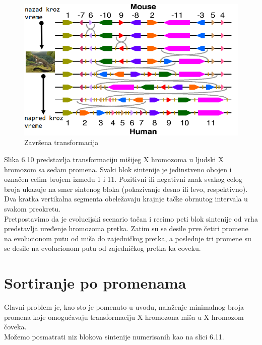 \begin{figure}[h!]
\centering
\includegraphics[scale=0.32]{poglavlja/6/slike/niz7.png}
\caption{Završena transformacija}
\end{figure}

\newpage
Slika 6.10 predstavlja transformaciju mišijeg X hromozoma u ljudski X hromozom sa sedam promena. Svaki blok sintenije je jedinstveno obojen i označen celim brojem između 1 i 11. Pozitivni ili negativni znak svakog celog broja ukazuje na smer sintenog bloka (pokazivanje desno ili levo, respektivno). Dva kratka vertikalna segmenta obeležavaju krajnje tačke obrnutog intervala u svakom preokretu.\\

Pretpostavimo da je evolucijski scenario tačan i recimo peti blok sintenije od vrha predstavlja uređenje hromozoma pretka. Zatim su se desile prve četiri promene na evolucionom putu od miša do zajedničkog pretka, a poslednje tri promene su se desile na evolucionom putu od zajedničkog pretka ka coveku.

\newpage
\section{Sortiranje po promenama}

\hspace{0.7cm} Glavni problem je, kao sto je pomenuto u uvodu, nalaženje minimalnog broja promena koje omogućavaju transformaciju X hromozona miša u X hromozom čoveka.\\

\noindent Možemo posmatrati niz blokova sintenije numerisanih kao na slici 6.11.\\

